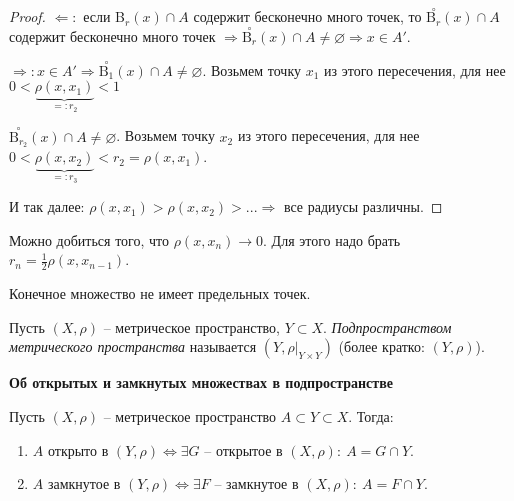 \begin{proof}
    $\Leftarrow:$ если B$_r(x)\cap A$ содержит бесконечно много точек, то $\overset{\circ}{\text{B}_r}(x)\cap A$ содержит  бесконечно много точек $\Rightarrow\overset{\circ}{\text{B}_r}(x)\cap A\neq \varnothing\Rightarrow x\in A'$.

    $\Rightarrow:x\in A'\Rightarrow \overset{\circ}{\text{B}_1}(x)\cap A\neq \varnothing$. Возьмем точку $x_1$ из этого пересечения, для нее $0<\underbrace{\rho(x,x_1)}_{=:r_2}<1$

    $\overset{\circ}{\text{B}_{r_2}}(x)\cap A\neq \varnothing$. Возьмем точку $x_2$ из этого пересечения, для нее $0<\underbrace{\rho(x,x_2)}_{=:r_3}<r_2=\rho(x,x_1)$.

    И так далее: $\rho(x,x_1)>\rho(x, x_2)>...\Rightarrow$ все радиусы различны.

\end{proof}

\begin{remark}
    Можно добиться того, что $\rho(x, x_n)\rightarrow 0$. Для этого надо брать $r_n=\frac{1}{2}\rho(x,x_{n-1})$.
\end{remark}

\begin{corollary}
    Конечное множество не имеет предельных точек.
\end{corollary}

\begin{definition}
    Пусть $(X,\rho)$ – метрическое пространство, $Y\subset X$. \textit{Подпространством метрического пространства} называется $(Y, \rho|_{Y\times Y})$ (более кратко: $(Y, \rho)$).
\end{definition}

\begin{theorem}
    \textbf{Об открытых и замкнутых множествах в подпространстве}

    Пусть $(X, \rho)$ – метрическое пространство $A\subset Y\subset X$. Тогда:
    \begin{enumerate}
        \item $A$ открыто в $(Y, \rho)\Leftrightarrow \exists G$ – открытое в $(X,\rho):\ A=G\cap Y$.
        \item $A$ замкнутое в $(Y, \rho)\Leftrightarrow \exists F$ – замкнутое в $(X,\rho):\ A=F\cap Y$.
    \end{enumerate}
\end{theorem}

